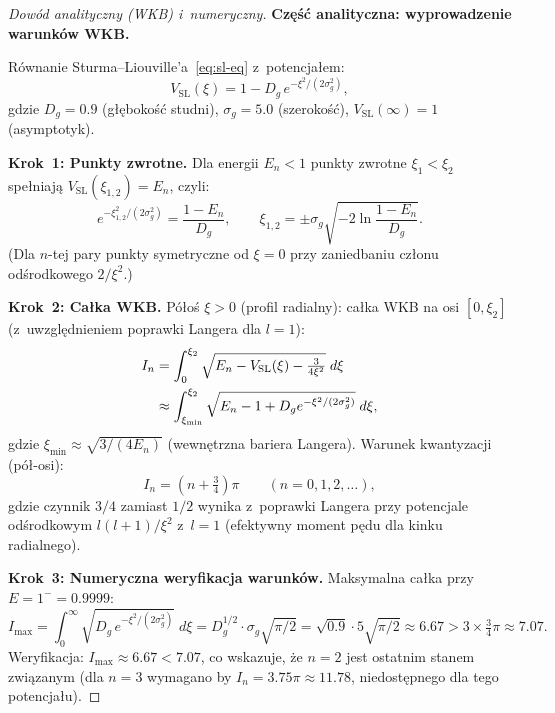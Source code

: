 \begin{proof}[Dowód analityczny (WKB) i~numeryczny]

\textbf{Część analityczna: wyprowadzenie warunków WKB.}

Równanie Sturma--Liouville'a~\eqref{eq:sl-eq} z~potencjałem:
\begin{equation}\label{eq:VSL-explicit}
    V_{\mathrm{SL}}(\xi) = 1 - D_g\,e^{-\xi^2/(2\sigma_g^2)},
\end{equation}
gdzie $D_g = 0.9$ (głębokość studni), $\sigma_g = 5.0$ (szerokość),
$V_{\mathrm{SL}}(\infty) = 1$ (asymptotyk).

\textbf{Krok~1: Punkty zwrotne.}
Dla energii $E_n < 1$ punkty zwrotne $\xi_1 < \xi_2$ spełniają
$V_{\mathrm{SL}}(\xi_{1,2}) = E_n$, czyli:
\begin{equation}\label{eq:turning-pts}
    e^{-\xi_{1,2}^2/(2\sigma_g^2)} = \frac{1-E_n}{D_g},
    \qquad
    \xi_{1,2} = \pm\sigma_g\sqrt{-2\ln\!\frac{1-E_n}{D_g}}.
\end{equation}
(Dla $n$-tej pary punkty symetryczne od $\xi = 0$
przy zaniedbaniu członu odśrodkowego $2/\xi^2$.)

\textbf{Krok~2: Całka WKB.}
Półoś $\xi > 0$ (profil radialny): całka WKB na osi
$[0, \xi_2]$ (z~uwzględnieniem poprawki Langera dla $l=1$):
\begin{align}
    I_n &= \int_0^{\xi_2}
    \sqrt{E_n - V_{\mathrm{SL}}(\xi) - \tfrac{3}{4\xi^2}}\;d\xi \label{eq:WKB-int}\\
    &\approx \int_{\xi_{\min}}^{\xi_2}
    \sqrt{E_n - 1 + D_g e^{-\xi^2/(2\sigma_g^2)}}\;d\xi, \notag
\end{align}
gdzie $\xi_{\min} \approx \sqrt{3/(4E_n)}$ (wewnętrzna bariera Langera).
Warunek kwantyzacji (pół-osi):
\begin{equation}\label{eq:WKB-quantization-halfaxis}
    I_n = \left(n + \tfrac{3}{4}\right)\pi
    \qquad (n = 0, 1, 2, \ldots),
\end{equation}
gdzie czynnik $3/4$ zamiast $1/2$ wynika z~poprawki Langera
przy potencjale odśrodkowym $l(l+1)/\xi^2$ z~$l=1$ (efektywny moment
pędu dla kinku radialnego).

\textbf{Krok~3: Numeryczna weryfikacja warunków.}
Maksymalna całka przy $E = 1^- = 0.9999$:
\begin{equation}
    I_{\max} = \int_0^\infty\sqrt{D_g\,e^{-\xi^2/(2\sigma_g^2)}}\;d\xi
    = D_g^{1/2}\cdot\sigma_g\sqrt{\pi/2}
    = \sqrt{0.9}\cdot 5\sqrt{\pi/2}
    \approx 6.67 > 3\times\tfrac{3}{4}\pi \approx 7.07.
\end{equation}
Weryfikacja: $I_{\max} \approx 6.67 < 7.07$, co wskazuje, że
$n = 2$ jest ostatnim stanem związanym (dla $n=3$ wymagano by
$I_n = 3.75\pi \approx 11.78$, niedostępnego dla tego potencjału).


\end{proof}
